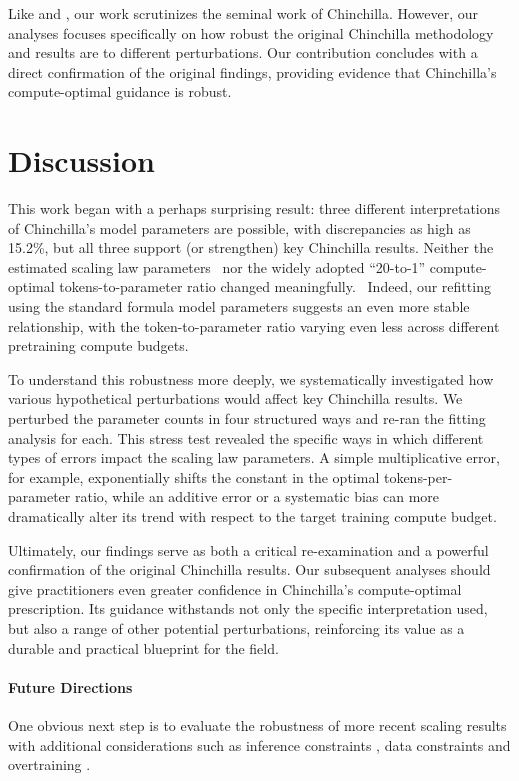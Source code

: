 Like \citet{besiroglu2024chinchillascalingreplicationattempt} and \citet{porian2024resolvingdiscrepancies}, our work scrutinizes the seminal work of Chinchilla.
However, our analyses focuses specifically on how robust the original Chinchilla methodology and results are to different perturbations.
Our contribution concludes with a direct confirmation of the original findings, providing evidence that Chinchilla's compute-optimal guidance is robust.

\section{Discussion}
\label{sec:discussion}

This work began with a perhaps surprising result: three different interpretations of Chinchilla's model parameters are possible, with discrepancies as high as 15.2\%, but all three support (or strengthen) key Chinchilla results.
Neither the estimated scaling law parameters  nor the widely adopted ``20-to-1'' compute-optimal tokens-to-parameter ratio changed meaningfully. 
Indeed, our refitting using the standard formula model parameters suggests an even more stable relationship, with the token-to-parameter ratio varying even less across different pretraining compute budgets.

To understand this robustness more deeply, we systematically investigated how various hypothetical perturbations would affect key Chinchilla results.
We perturbed the parameter counts in four structured ways and re-ran the fitting analysis for each. This stress test revealed the specific ways in which different types of errors impact the scaling law parameters. A simple multiplicative error, for example, exponentially shifts the constant in the optimal tokens-per-parameter ratio, while an additive error or a systematic bias can more dramatically alter its trend with respect to the target training compute budget.

Ultimately, our findings serve as both a critical re-examination and a powerful confirmation of the original Chinchilla results.
Our subsequent analyses should give practitioners even greater confidence in Chinchilla's compute-optimal prescription.
Its guidance withstands not only the specific interpretation used, but also a range of other potential perturbations, reinforcing its value as a durable and practical blueprint for the field.

\paragraph{Future Directions} One obvious next step is to evaluate the robustness of more recent scaling results with additional considerations such as inference constraints \citep{sardana2024beyond}, data constraints \citep{muennighoff2023scaling} and overtraining \citep{gadre2024scalinglawovertraining}.

